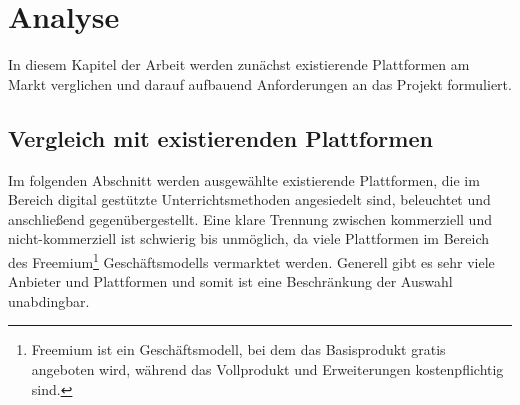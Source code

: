 \section{Analyse}\label{sec:analyse}
In diesem Kapitel der Arbeit werden zunächst existierende Plattformen am Markt verglichen und darauf aufbauend Anforderungen an das Projekt formuliert.
\subsection{Vergleich mit existierenden Plattformen}\label{sec:vergleichplat}
Im folgenden Abschnitt werden ausgewählte existierende Plattformen, die im Bereich 
digital gestützte Unterrichtsmethoden angesiedelt sind, beleuchtet und anschließend 
gegenübergestellt. Eine klare Trennung zwischen kommerziell und nicht-kommerziell ist schwierig bis unmöglich, da viele Plattformen im Bereich des Freemium\footnote{Freemium ist ein Geschäftsmodell, bei dem das Basisprodukt gratis angeboten wird, während das Vollprodukt und Erweiterungen kostenpflichtig sind.} Geschäftsmodells vermarktet werden. Generell gibt es sehr viele Anbieter und Plattformen und somit ist eine Beschränkung der Auswahl unabdingbar. 

